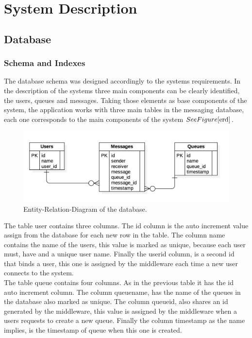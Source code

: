 \section{System Description}\label{sec:system-description}

\subsection{Database}\label{sec:database}

\subsubsection{Schema and Indexes}\label{sec:schema-and-indexes}
The database schema was designed accordingly to the systems requirements. In the description of the systems three main components can be clearly identified, the users, queues and messages. Taking those elements as base components of the system, the application works with three main tables in the messaging database, each one corresponds to the main components of the system \( See Figure \ref{erd} \).\\

\begin{figure}[h!]
	\centering
	\includegraphics[width=\textwidth]{ERDDiagram1.png}
	\caption{Entity-Relation-Diagram of the database.}
	\label{erd}
\end{figure}


The table user contains three columns. The id column is the auto increment value assign from the database for each new row in the table. The column name contains the name of the users, this value is marked as unique, because each user must, have and a unique user name. Finally the userid column, is a second id that binds a user, this one is assigned by the middleware each time a new user connects to the system.\\

The table queue contains four columns. As in the previous table it has the id auto increment column. The column queuename, has the name of the queues in the database also marked as unique. The column queueid, also shares an id generated by the middleware, this value is assigned by the middleware when a users requests to create a new queue. Finally the column timestamp as the name implies, is the timestamp of queue when this one is created.\\

